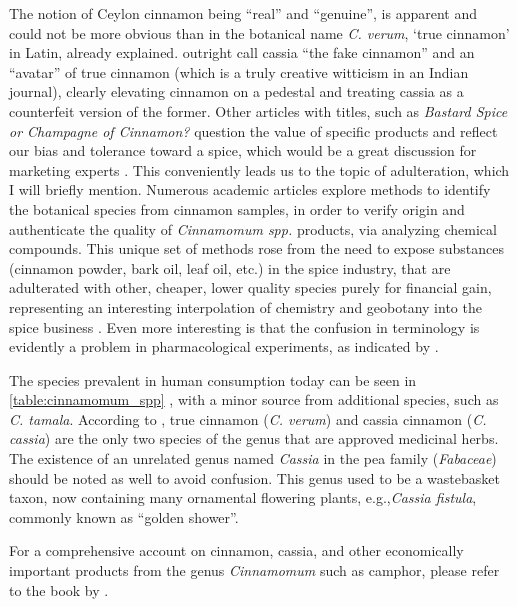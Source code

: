 The notion of Ceylon cinnamon being ``real'' and ``genuine'', is apparent and could not be more obvious than in the botanical name \textit{C. verum}, `true cinnamon' in Latin, already explained. \textcite{dinesh_controversies_2015} outright call cassia ``the fake cinnamon'' and an ``avatar'' of true cinnamon (which is a truly creative witticism in an Indian journal), clearly elevating cinnamon on a pedestal and treating cassia as a counterfeit version of the former. Other articles with titles, such as \textit{Bastard Spice or Champagne of Cinnamon?} question the value of specific products and reflect our bias and tolerance toward a spice, which would be a great discussion for marketing experts \parencite[see][]{derks_bastard_2020}.  
This conveniently leads us to the topic of adulteration, which I will briefly mention. Numerous academic articles explore methods to identify the botanical species from cinnamon samples, in order to verify origin and authenticate the quality of \textit{Cinnamomum spp.} products, via analyzing chemical compounds. This unique set of methods rose from the need to expose substances (cinnamon powder, bark oil, leaf oil, etc.) in the spice industry, that are adulterated with other, cheaper, lower quality species purely for financial gain, representing an interesting interpolation of chemistry and geobotany into the spice business \parencite[see][]{ford_cinnamon_2019}. Even more interesting is that the confusion in terminology is evidently a problem in pharmacological experiments, as indicated by \textcite{oketch-rabah_cinnamon_2018}.

The species prevalent in human consumption today can be seen in \cref{table:cinnamomum_spp} \parencite{kawatra_cinnamon_2015}, with a minor source from additional species, such as \textit{C. tamala}. According to \textcite{ulbricht_evidence-based_2011}, true cinnamon (\textit{C. verum}) and cassia cinnamon (\textit{C. cassia}) are the only two species of the genus that are approved medicinal herbs. The existence of an unrelated genus named \textit{Cassia} in the pea family (\textit{Fabaceae}) should be noted as well to avoid confusion. This genus used to be a wastebasket taxon, now containing many ornamental flowering plants, e.g.,\textit{Cassia fistula}, commonly known as ``golden shower''. 

For a comprehensive account on cinnamon, cassia, and other economically important products from the genus \textit{Cinnamomum} such as camphor, please refer to the book by \textcite{ravindran_cinnamon_2004}.

